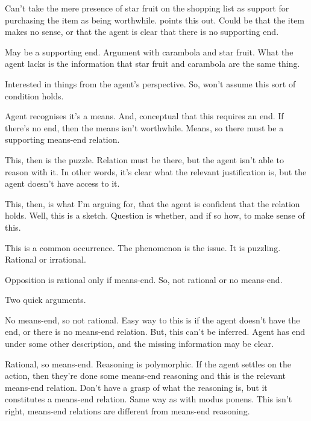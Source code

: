 \documentclass[10pt]{article}
\begin{document}
Can't take the mere presence of star fruit on the shopping list as support for purchasing the item as being worthwhile.
\citeauthor{Anscombe:1957aa} points this out.
Could be that the item makes no sense, or that the agent is clear that there is no supporting end.

May be a supporting end.
Argument with carambola and star fruit.
What the agent lacks is the information that star fruit and carambola are the same thing.

Interested in things from the agent's perspective.
So, won't assume this sort of condition holds.

Agent recognises it's a means.
And, conceptual that this requires an end.
If there's no end, then the means isn't worthwhile.
Means, so there must be a supporting means-end relation.

This, then is the puzzle.
Relation must be there, but the agent isn't able to reason with it.
In other words, it's clear what the relevant justification is, but the agent doesn't have access to it.

This, then, is what I'm arguing for, that the agent is confident that the relation holds.
Well, this is a sketch.
Question is whether, and if so how, to make sense of this.


This is a common occurrence.
The phenomenon is the issue.
It is puzzling.
Rational or irrational.

Opposition is rational only if means-end.
So, not rational or no means-end.

Two quick arguments.

No means-end, so not rational.
Easy way to this is if the agent doesn't have the end, or there is no means-end relation.
But, this can't be inferred.
Agent has end under some other description, and the missing information may be clear.

Rational, so means-end.
Reasoning is polymorphic.
If the agent settles on the action, then they're done some means-end reasoning and this is the relevant means-end relation.
Don't have a grasp of what the reasoning is, but it constitutes a means-end relation.
Same way as with modus ponens.
This isn't right, means-end relations are different from means-end reasoning.





\newpage
\end{document}

